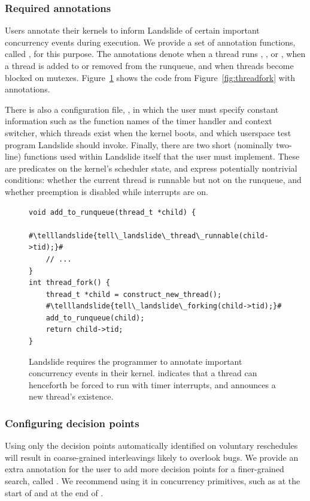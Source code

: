 \subsubsection{Required annotations}
Users annotate their kernels to inform Landslide of certain important concurrency events during execution. We provide a set of annotation functions, called , for this purpose. The annotations denote when a thread runs , , or , when a thread is added to or removed from the runqueue, and when threads become blocked on mutexes.
Figure~\ref{fig:annotation} shows the code from Figure~\ref{fig:threadfork} with  annotations.

There is also a configuration file, , in which the user must specify constant information such as the function names of the timer handler and context switcher, which threads exist when the kernel boots, and which userspace test program Landslide should invoke.
Finally, there are two short (nominally two-line) functions used within Landslide itself that the user must implement. These are predicates on the kernel's scheduler state, and express potentially nontrivial conditions: whether the current thread is runnable but not on the runqueue, and whether preemption is disabled while interrupts are on.

\newcommand\telllandslide[1]{\bfseries \color{violet}{#1}}
\begin{figure}[t]
\small
\begin{lstlisting}
void add_to_runqueue(thread_t *child) {
	#\telllandslide{tell\_landslide\_thread\_runnable(child->tid);}#
	// ...
}
int thread_fork() {
	thread_t *child = construct_new_thread();
	#\telllandslide{tell\_landslide\_forking(child->tid);}#
	add_to_runqueue(child);
	return child->tid;
}
\end{lstlisting}
\caption{Landslide requires the programmer to annotate important concurrency events in their kernel.  indicates that a thread can henceforth be forced to run with timer interrupts, and  announces a new thread's existence.}
\label{fig:annotation}
\end{figure}

\subsubsection{Configuring decision points}
\label{sec:decision}

Using only the decision points automatically identified on voluntary reschedules will result in coarse-grained interleavings likely to overlook bugs.
We provide an extra annotation
for the user to add more decision points for a finer-grained search, called
.
We recommend using it in concurrency primitives, such as at the start of  and at the end of .

